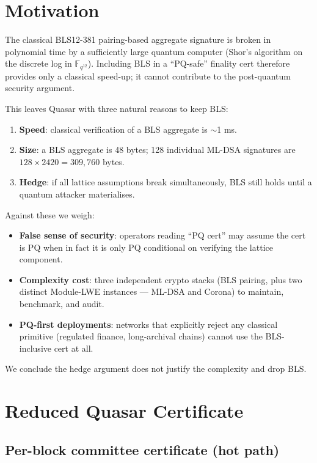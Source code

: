 \documentclass[11pt]{article}
\begin{document}
\section{Motivation}

The classical BLS12-381 pairing-based aggregate signature is broken in
polynomial time by a sufficiently large quantum computer (Shor's algorithm
on the discrete log in $\mathbb{F}_{q^{12}}$). Including BLS in a
``PQ-safe'' finality cert therefore provides only a classical speed-up;
it cannot contribute to the post-quantum security argument.

This leaves Quasar with three natural reasons to keep BLS:
\begin{enumerate}
  \item \textbf{Speed}: classical verification of a BLS aggregate is ${\sim}$1 ms.
  \item \textbf{Size}: a BLS aggregate is 48 bytes; 128 individual ML-DSA
        signatures are $128 \times 2420 = 309{,}760$ bytes.
  \item \textbf{Hedge}: if all lattice assumptions break simultaneously,
        BLS still holds until a quantum attacker materialises.
\end{enumerate}

Against these we weigh:
\begin{itemize}
  \item \textbf{False sense of security}: operators reading ``PQ cert''
        may assume the cert is PQ when in fact it is only PQ conditional
        on verifying the lattice component.
  \item \textbf{Complexity cost}: three independent crypto stacks
        (BLS pairing, plus two distinct Module-LWE instances --- ML-DSA
        and Corona) to maintain, benchmark, and audit.
  \item \textbf{PQ-first deployments}: networks that explicitly reject
        any classical primitive (regulated finance, long-archival chains)
        cannot use the BLS-inclusive cert at all.
\end{itemize}

We conclude the hedge argument does not justify the complexity and drop
BLS.

\section{Reduced Quasar Certificate}

\subsection{Per-block committee certificate (hot path)}
\end{document}
